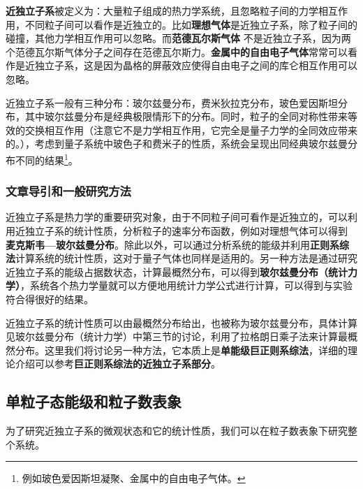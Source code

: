 

\textbf{近独立子系}被定义为：大量粒子组成的热力学系统，且忽略粒子间的力学相互作用，不同粒子间可以看作是近独立的。比如\textbf{理想气体}是近独立子系，除了粒子间的碰撞，其他力学相互作用可以忽略。而\textbf{范德瓦尔斯气体} 不是近独立子系，因为两个范德瓦尔斯气体分子之间存在范德瓦尔斯力。\textbf{金属中的自由电子气体}常常可以看作是近独立子系，这是因为晶格的屏蔽效应使得自由电子之间的库仑相互作用可以忽略。

近独立子系一般有三种分布：玻尔兹曼分布，费米狄拉克分布，玻色爱因斯坦分布，其中玻尔兹曼分布是经典极限情形下的分布。同时，粒子的全同对称性带来等效的交换相互作用（注意它不是力学相互作用，它完全是量子力学的全同效应带来的。），考虑到量子系统中玻色子和费米子的性质，系统会呈现出同经典玻尔兹曼分布不同的结果\footnote{例如玻色爱因斯坦凝聚、金属中的自由电子气体。}。

\subsubsection{文章导引和一般研究方法}
近独立子系是热力学的重要研究对象，由于不同粒子间可看作是近独立的，可以利用近独立子系的统计性质，分析粒子的速率分布函数，例如对理想气体可以得到 \textbf{麦克斯韦—玻尔兹曼分布}。除此以外，可以通过分析系统的能级并利用\textbf{正则系综法}计算系统的统计性质，这对于量子气体也同样是适用的。另一种方法是通过研究近独立子系的能级占据数状态，计算最概然分布，可以得到\textbf{玻尔兹曼分布（统计力学）}，系统各个热力学量就可以方便地用统计力学公式进行计算，可以得到与实验符合得很好的结果。

近独立子系的统计性质可以由最概然分布给出，也被称为玻尔兹曼分布，具体计算见玻尔兹曼分布（统计力学）中第三节的讨论，利用了拉格朗日乘子法来计算最概然分布。这里我们将讨论另一种方法，它本质上是\textbf{单能级巨正则系综法}，详细的理论介绍可以参考\textbf{巨正则系综法的近独立子系部分}。

\subsection{单粒子态能级和粒子数表象}
为了研究近独立子系的微观状态和它的统计性质，我们可以在粒子数表象下研究整个系统。

